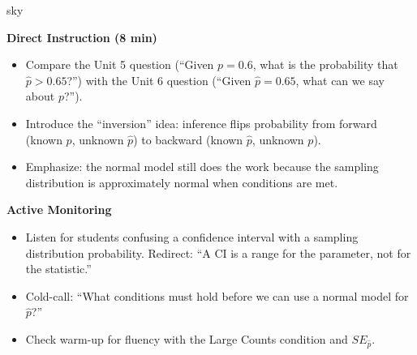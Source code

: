 \documentclass[10pt]{article}
\begin{document}
\begin{skillbox}{sky}
\begin{minipage}[t]{0.48\linewidth}
    \textbf{Direct Instruction (8 min)}
    \begin{itemize}
        \item Compare the Unit 5 question (``Given $p = 0.6$, what is the probability
              that $\hat p > 0.65$?'') with the Unit 6 question (``Given $\hat p = 0.65$,
              what can we say about $p$?'').
        \item Introduce the ``inversion'' idea: inference flips probability from forward
              (known $p$, unknown $\hat p$) to backward (known $\hat p$, unknown $p$).
        \item Emphasize: the normal model still does the work because the sampling
              distribution is approximately normal when conditions are met.
    \end{itemize}
\end{minipage}
\hfill
\begin{minipage}[t]{0.48\linewidth}
    \textbf{Active Monitoring}
    \begin{itemize}
        \item Listen for students confusing a confidence interval with a sampling
              distribution probability. Redirect: ``A CI is a range for the parameter,
              not for the statistic.''
        \item Cold-call: ``What conditions must hold before we can use a normal model
              for $\hat p$?''
        \item Check warm-up for fluency with the Large Counts condition and $SE_{\hat p}$.
    \end{itemize}
\end{minipage}
\end{skillbox}
\end{document}
